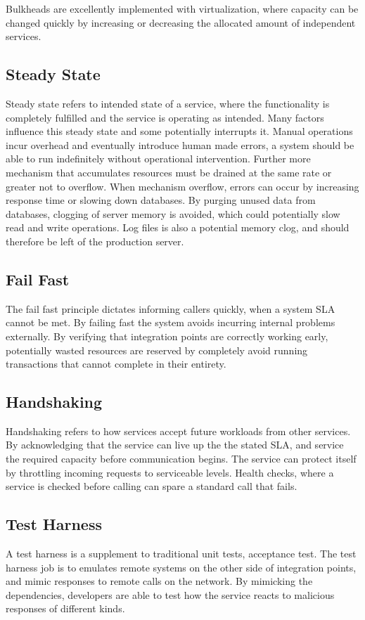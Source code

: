 Bulkheads are excellently implemented with virtualization, where capacity can be changed quickly by increasing or decreasing the allocated amount of independent services.


\subsection{Steady State}
Steady state refers to intended state of a service, where the functionality is completely fulfilled and the service is operating as intended. Many factors influence this steady state and some potentially interrupts it. Manual operations incur overhead and eventually introduce human made errors, a system should be able to run indefinitely without operational intervention.  Further more mechanism that accumulates resources must be drained at the same rate or greater not to overflow. When mechanism overflow, errors can occur by increasing response time or slowing down databases. By purging unused data from databases, clogging of server memory is avoided, which could potentially slow read and write operations. Log files is also a potential memory clog, and should therefore be left of the production server.


\subsection{Fail Fast}
The fail fast principle dictates informing callers quickly, when a system SLA cannot be met. By failing fast the system avoids incurring internal problems externally. By verifying that integration points are correctly working early, potentially wasted resources are reserved by completely avoid running transactions that cannot complete in their entirety.

\subsection{Handshaking}
Handshaking refers to how services accept future workloads from other services. By acknowledging that the service can live up the the stated SLA, and service the required capacity before communication begins. The service can protect itself by throttling incoming requests to serviceable levels. Health checks, where a service is checked before calling can spare a standard call that fails.

\subsection{Test Harness}
A test harness is a supplement to traditional unit tests, acceptance test. The test harness job is to emulates remote systems on the other side of integration points, and mimic responses to remote calls on the network. By mimicking the dependencies, developers are able to test how the service reacts to malicious responses of different kinds.

